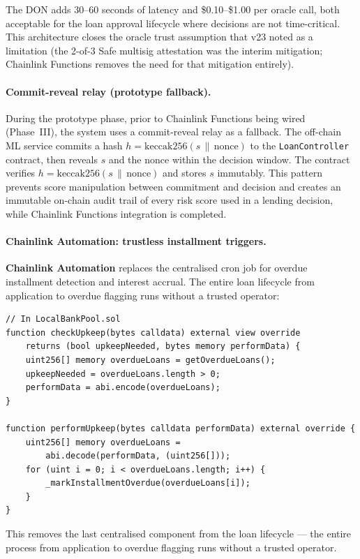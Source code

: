 \documentclass[12pt,a4paper]{report}
\begin{document}
The DON adds 30--60 seconds of latency and \$0.10--\$1.00 per oracle call, both acceptable for the loan approval lifecycle where decisions are not time-critical. This architecture closes the oracle trust assumption that v23 noted as a limitation (the 2-of-3 Safe multisig attestation was the interim mitigation; Chainlink Functions removes the need for that mitigation entirely).

\paragraph{Commit-reveal relay (prototype fallback).}
During the prototype phase, prior to Chainlink Functions being wired (Phase~III), the system uses a commit-reveal relay as a fallback. The off-chain ML service commits a hash $h = \text{keccak256}(s \,\|\, \text{nonce})$ to the \texttt{LoanController} contract, then reveals $s$ and the nonce within the decision window. The contract verifies $h = \text{keccak256}(s \,\|\, \text{nonce})$ and stores $s$ immutably. This pattern prevents score manipulation between commitment and decision and creates an immutable on-chain audit trail of every risk score used in a lending decision, while Chainlink Functions integration is completed.

\paragraph{Chainlink Automation: trustless installment triggers.}
\textbf{Chainlink Automation} replaces the centralised cron job for overdue installment detection and interest accrual. The entire loan lifecycle from application to overdue flagging runs without a trusted operator:

\begin{verbatim}
// In LocalBankPool.sol
function checkUpkeep(bytes calldata) external view override
    returns (bool upkeepNeeded, bytes memory performData) {
    uint256[] memory overdueLoans = getOverdueLoans();
    upkeepNeeded = overdueLoans.length > 0;
    performData = abi.encode(overdueLoans);
}

function performUpkeep(bytes calldata performData) external override {
    uint256[] memory overdueLoans =
        abi.decode(performData, (uint256[]));
    for (uint i = 0; i < overdueLoans.length; i++) {
        _markInstallmentOverdue(overdueLoans[i]);
    }
}
\end{verbatim}

This removes the last centralised component from the loan lifecycle --- the entire process from application to overdue flagging runs without a trusted operator.
\end{document}

